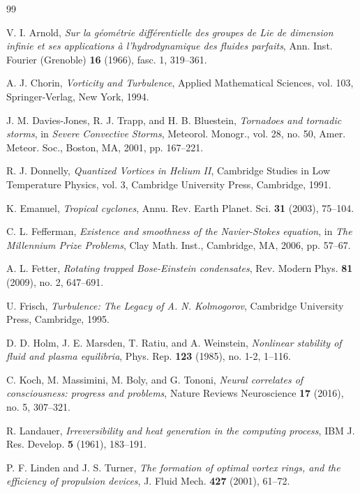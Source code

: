 \documentclass[12pt]{article}
\begin{document}

\begin{thebibliography}{99}

 V. I. Arnold, \emph{Sur la géométrie différentielle des groupes de Lie de dimension infinie et ses applications à l'hydrodynamique des fluides parfaits}, Ann. Inst. Fourier (Grenoble) \textbf{16} (1966), fasc. 1, 319--361.

 A. J. Chorin, \emph{Vorticity and Turbulence}, Applied Mathematical Sciences, vol. 103, Springer-Verlag, New York, 1994.

 J. M. Davies-Jones, R. J. Trapp, and H. B. Bluestein, \emph{Tornadoes and tornadic storms}, in \emph{Severe Convective Storms}, Meteorol. Monogr., vol. 28, no. 50, Amer. Meteor. Soc., Boston, MA, 2001, pp. 167--221.

 R. J. Donnelly, \emph{Quantized Vortices in Helium II}, Cambridge Studies in Low Temperature Physics, vol. 3, Cambridge University Press, Cambridge, 1991.

 K. Emanuel, \emph{Tropical cyclones}, Annu. Rev. Earth Planet. Sci. \textbf{31} (2003), 75--104.

 C. L. Fefferman, \emph{Existence and smoothness of the Navier-Stokes equation}, in \emph{The Millennium Prize Problems}, Clay Math. Inst., Cambridge, MA, 2006, pp. 57--67.

 A. L. Fetter, \emph{Rotating trapped Bose-Einstein condensates}, Rev. Modern Phys. \textbf{81} (2009), no. 2, 647--691.

 U. Frisch, \emph{Turbulence: The Legacy of A. N. Kolmogorov}, Cambridge University Press, Cambridge, 1995.

 D. D. Holm, J. E. Marsden, T. Ratiu, and A. Weinstein, \emph{Nonlinear stability of fluid and plasma equilibria}, Phys. Rep. \textbf{123} (1985), no. 1-2, 1--116.

 C. Koch, M. Massimini, M. Boly, and G. Tononi, \emph{Neural correlates of consciousness: progress and problems}, Nature Reviews Neuroscience \textbf{17} (2016), no. 5, 307--321.

 R. Landauer, \emph{Irreversibility and heat generation in the computing process}, IBM J. Res. Develop. \textbf{5} (1961), 183--191.

 P. F. Linden and J. S. Turner, \emph{The formation of optimal vortex rings, and the efficiency of propulsion devices}, J. Fluid Mech. \textbf{427} (2001), 61--72.


\end{thebibliography}
\end{document}
